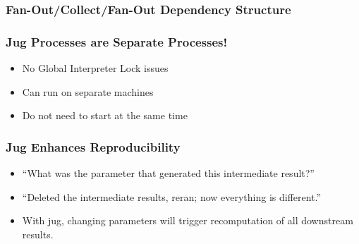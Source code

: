 \documentclass{beamer}
\begin{document}
\begin{frame}[fragile]
\frametitle{Fan-Out/Collect/Fan-Out Dependency Structure}

\begin{center}

\end{center}

\end{frame}

\begin{frame}[fragile]
\frametitle{Jug Processes are Separate Processes!}
\begin{itemize}
\item \alert{No Global Interpreter Lock} issues
\item Can run on \alert{separate machines}
\item Do not need to start at the same time
\end{itemize}
\end{frame}


\begin{frame}[fragile]
\frametitle{Jug Enhances Reproducibility}

\begin{itemize}
\item ``What was the parameter that generated this intermediate result?''
\item ``Deleted the intermediate results, reran; now everything is different.''
\end{itemize}

\begin{itemize}
\item With jug, changing parameters \alert{will trigger recomputation of all
downstream results}.
\end{itemize}

\end{frame}
\end{document}
